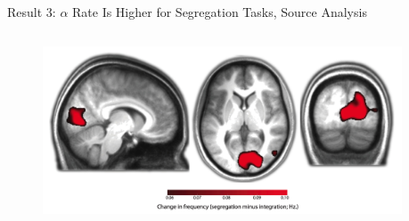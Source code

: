\begin{frame}{Result 3: $\alpha$ Rate Is Higher for Segregation Tasks, Source Analysis}
    \begin{columns}

        \begin{column}{0.6\textwidth}
            \begin{figure}\label{fig:res3_2}
            \centering
            \includegraphics[height = 0.5 \textheight]{images/res3_2.png}
            \end{figure}
        \end{column}
        
        \begin{column}{0.35\textwidth}
    
        
        \end{column}
        \end{columns}
    
\end{frame}

